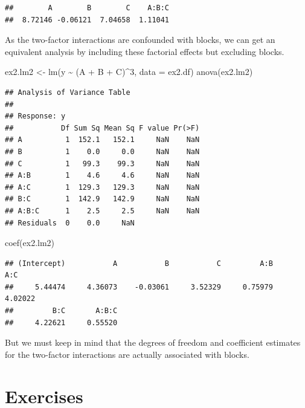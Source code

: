 \documentclass[
]{book}
\newenvironment{Shaded}{\begin{snugshade}}{\end{snugshade}}
\newcommand{\AttributeTok}[1]{\textcolor[rgb]{0.77,0.63,0.00}{#1}}
\newcommand{\DecValTok}[1]{\textcolor[rgb]{0.00,0.00,0.81}{#1}}
\newcommand{\FunctionTok}[1]{\textcolor[rgb]{0.00,0.00,0.00}{#1}}
\newcommand{\NormalTok}[1]{#1}
\newcommand{\OtherTok}[1]{\textcolor[rgb]{0.56,0.35,0.01}{#1}}
\newcommand{\SpecialCharTok}[1]{\textcolor[rgb]{0.00,0.00,0.00}{#1}}
\theoremstyle{definition}
\theoremstyle{definition}
\theoremstyle{definition}
\theoremstyle{definition}
\theoremstyle{remark}
\begin{document}
\begin{verbatim}
##        A        B        C    A:B:C 
##  8.72146 -0.06121  7.04658  1.11041
\end{verbatim}

As the two-factor interactions are confounded with blocks, we can get an equivalent analysis by including these factorial effects but excluding blocks.

\begin{Shaded}
\begin{Highlighting}[]
\NormalTok{ex2.lm2 }\OtherTok{\textless{}{-}} \FunctionTok{lm}\NormalTok{(y }\SpecialCharTok{\textasciitilde{}}\NormalTok{  (A }\SpecialCharTok{+}\NormalTok{ B }\SpecialCharTok{+}\NormalTok{ C)}\SpecialCharTok{\^{}}\DecValTok{3}\NormalTok{, }\AttributeTok{data =}\NormalTok{ ex2.df)}
\FunctionTok{anova}\NormalTok{(ex2.lm2)}
\end{Highlighting}
\end{Shaded}

\begin{verbatim}
## Analysis of Variance Table
## 
## Response: y
##           Df Sum Sq Mean Sq F value Pr(>F)
## A          1  152.1   152.1     NaN    NaN
## B          1    0.0     0.0     NaN    NaN
## C          1   99.3    99.3     NaN    NaN
## A:B        1    4.6     4.6     NaN    NaN
## A:C        1  129.3   129.3     NaN    NaN
## B:C        1  142.9   142.9     NaN    NaN
## A:B:C      1    2.5     2.5     NaN    NaN
## Residuals  0    0.0     NaN
\end{verbatim}

\begin{Shaded}
\begin{Highlighting}[]
\FunctionTok{coef}\NormalTok{(ex2.lm2)}
\end{Highlighting}
\end{Shaded}

\begin{verbatim}
## (Intercept)           A           B           C         A:B         A:C 
##     5.44474     4.36073    -0.03061     3.52329     0.75979     4.02022 
##         B:C       A:B:C 
##     4.22621     0.55520
\end{verbatim}

But we must keep in mind that the degrees of freedom and coefficient estimates for the two-factor interactions are actually associated with blocks.

\hypertarget{exercises-4}{%
\section{Exercises}\label{exercises-4}}
\end{document}
